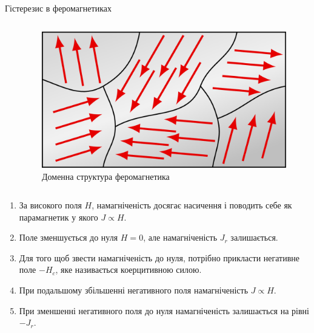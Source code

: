 \documentclass[onlytextwidth]{beamer}
\begin{document}
\begin{frame}{Гістерезис в феромагнетиках}{}
\begin{columns}
\begin{column}{0.5\linewidth}
		\end{column}
		\begin{column}{0.5\linewidth}
			\begin{figure}
				\includegraphics[width=0.5\linewidth]{domains}
				\caption{\centering\scriptsize Доменна структура феромагнетика}
			\end{figure}
		\end{column}
	\end{columns}
	\begin{enumerate}\justifying\scriptsize
		\item За високого поля $ H $, намагніченість досягає насичення і поводить себе як
		      парамагнетик у якого $J \propto H$.
		\item  Поле зменшується до нуля $H = 0$, але намагніченість $ J_r $ залишається.
		\item Для того щоб звести намагніченість до нуля, потрібно прикласти негативне поле $-H_c$,
		      яке називається \alert{коерцитивною силою}.
		\item При подальшому збільшенні негативного поля намагніченість $J \propto H$.
		\item  При зменшенні негативного поля до нуля намагніченість залишається на рівні $ -J_r $.
	\end{enumerate}
\end{frame}
\end{document}
